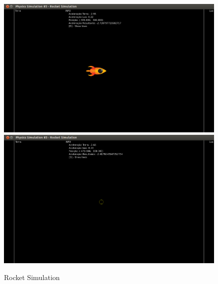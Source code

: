  \begin{figure}
	\centering
	\caption{Rocket Simulation}
    \includegraphics[scale=0.4]{images/rocket-simulation.png}
    \includegraphics[scale=0.4]{images/rocket-simulationE.png}
  \end{figure}

